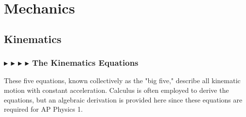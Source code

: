 %
%
%   

\chapter{Mechanics}\label{cap2}

%
%
%
%

\section{Kinematics}\label{1.1}

%
%
\subsection{\color{OrangeRed} $\blacktriangleright$ \color{PineGreen} $\blacktriangleright$ \color{Goldenrod} $\blacktriangleright$ \color{Orchid} $\blacktriangleright$ \color{black} The Kinematics Equations}\label{1.1.1}
These five equations, known collectively as the "big five," describe all kinematic motion with constant acceleration. Calculus is often employed to derive the equations, but an algebraic derivation is provided here since these equations are required for AP Physics 1. 

